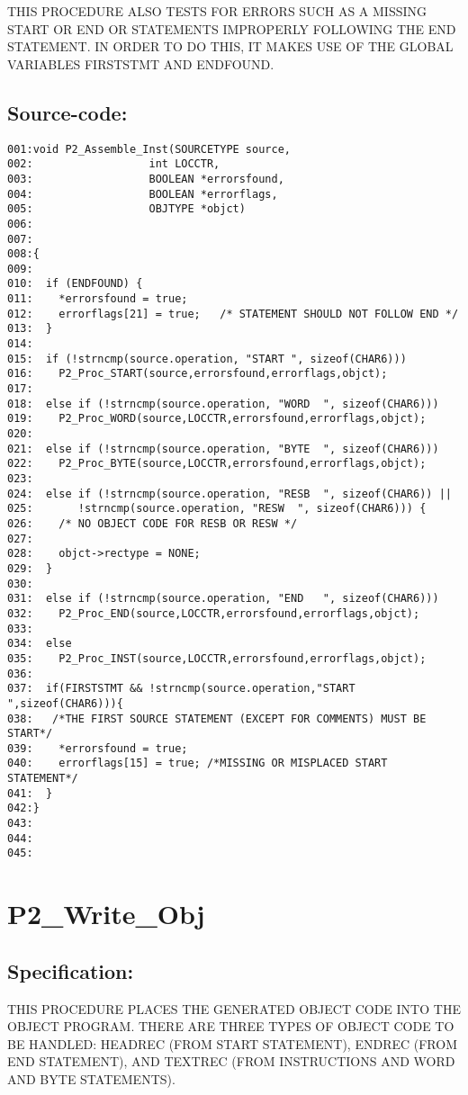 THIS PROCEDURE ALSO TESTS FOR ERRORS SUCH AS A MISSING START OR END OR
STATEMENTS IMPROPERLY FOLLOWING THE END STATEMENT. IN ORDER TO DO THIS, IT
MAKES USE OF THE GLOBAL VARIABLES FIRSTSTMT AND ENDFOUND.
\subsection*{Source-code:}
\begin{verbatim}
001:void P2_Assemble_Inst(SOURCETYPE source,
002:                  int LOCCTR,
003:                  BOOLEAN *errorsfound,
004:                  BOOLEAN *errorflags,
005:                  OBJTYPE *objct)
006:
007:
008:{
009:  
010:  if (ENDFOUND) {
011:    *errorsfound = true;
012:    errorflags[21] = true;   /* STATEMENT SHOULD NOT FOLLOW END */
013:  }
014:
015:  if (!strncmp(source.operation, "START ", sizeof(CHAR6))) 
016:    P2_Proc_START(source,errorsfound,errorflags,objct);
017:  
018:  else if (!strncmp(source.operation, "WORD  ", sizeof(CHAR6))) 
019:    P2_Proc_WORD(source,LOCCTR,errorsfound,errorflags,objct);
020:
021:  else if (!strncmp(source.operation, "BYTE  ", sizeof(CHAR6)))
022:    P2_Proc_BYTE(source,LOCCTR,errorsfound,errorflags,objct);
023:
024:  else if (!strncmp(source.operation, "RESB  ", sizeof(CHAR6)) ||
025:       !strncmp(source.operation, "RESW  ", sizeof(CHAR6))) {
026:    /* NO OBJECT CODE FOR RESB OR RESW */
027:    
028:    objct->rectype = NONE;
029:  } 
030:  
031:  else if (!strncmp(source.operation, "END   ", sizeof(CHAR6))) 
032:    P2_Proc_END(source,LOCCTR,errorsfound,errorflags,objct);
033:  
034:  else 
035:    P2_Proc_INST(source,LOCCTR,errorsfound,errorflags,objct);
036:
037:  if(FIRSTSTMT && !strncmp(source.operation,"START ",sizeof(CHAR6))){
038:   /*THE FIRST SOURCE STATEMENT (EXCEPT FOR COMMENTS) MUST BE START*/
039:    *errorsfound = true;
040:    errorflags[15] = true; /*MISSING OR MISPLACED START STATEMENT*/
041:  }
042:}
043:
044:
045:
\end{verbatim}
\section{P2\_Write\_Obj}
\subsection*{Specification:}
THIS PROCEDURE PLACES THE GENERATED OBJECT CODE INTO THE OBJECT
PROGRAM. THERE ARE THREE TYPES OF OBJECT CODE TO BE HANDLED: HEADREC (FROM
START STATEMENT), ENDREC (FROM END STATEMENT), AND TEXTREC (FROM INSTRUCTIONS
AND WORD AND BYTE STATEMENTS).

